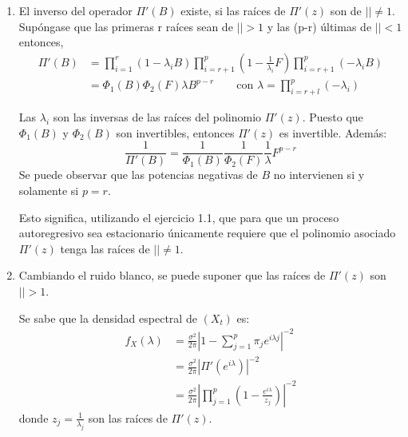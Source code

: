 \begin{observacion}
\quad
\begin{enumerate}
\item El inverso del operador $\Pi'(B)$ existe, si las ra\'{i}ces de $\Pi'(z)$ son de $\left| \right|\ne 1$. Sup\'{o}ngase que las primeras r ra\'{i}ces sean de $\left| \right|>1$ y las (p-r) \'{u}ltimas de $\left| \right|<1$
entonces, 
\begin{align*}
 \Pi'(B)
	 &=\prod_{i=1}^{r} (1-\lambda_{i} B)\prod_{i=r+1}^{p} \left( {1-\frac{1}{\lambda_{i} }F} \right)\prod_{i=r+1}^{p} (-\lambda_{i} B)\\
	 &=\Phi_{1} \left( B \right)\Phi_{2} (F)\lambda B^{p-r}\qquad\text{con }\lambda 
=\prod_{i=r+l}^{p} \left( {-\lambda_{i} } \right)
\end{align*}

Las $\lambda_{i}$ son las inversas de las ra\'{i}ces del polinomio 
${\Pi }'\left( z \right)$. Puesto que $\Phi_{1} (B)$ y $\Phi_{2} 
(B)$ son invertibles, entonces $\Pi'(z)$ es invertible. Adem\'{a}s:
\[
\frac{1}{\Pi'(B)}=\frac{1}{\Phi_{1} (B)}\frac{1}{\Phi_{2} 
(F)}\frac{1}{\lambda }F^{p-r}
\]
Se puede observar que las potencias negativas de $B$ no intervienen si y solamente si $p=r$.\newline

Esto significa, utilizando el ejercicio 1.1, que para que un proceso autoregresivo sea estacionario \'{u}nicamente requiere que el polinomio asociado ${\Pi }'\left( z \right)$ tenga las ra\'{i}ces de $\left| \right|\ne 1$.

\item Cambiando el ruido blanco, se puede suponer que las ra\'{i}ces de $\Pi'(z)$ son $\left| \right|>1$.\newline

Se sabe que la densidad espectral de $(X_{{t}})$ es:
\begin{align*}
 f_{X} (\lambda )
	 &=\frac{\sigma^{2}}{2\pi }\left| {1-\sum_{j=1}^p {\pi_{j} e^{i\lambda j}} } \right|^{-2}\\
	 &=\frac{\sigma ^{2}}{2\pi }\left| {\Pi'(e^{i\lambda })} \right|^{-2}\\
	 &=\frac{\sigma^{2}}{2\pi }\left| {\prod_{j=1}^{p} \left({1-\frac{e^{i\lambda }}{z_{j} }} \right)} \right|^{-2}
\end{align*}
donde $z_{j} =\frac{1}{\lambda_{j} }$ son las ra\'{i}ces de $\Pi'(z)$.\newline


\end{enumerate}
\end{observacion}
